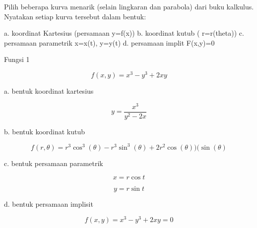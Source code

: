 \documentclass[12pt,arial,letterpaper]{book}
\begin{document}
\begin{eulercomment}
\begin{eulercomment}
\begin{eulercomment}
\begin{eulercomment}
\begin{eulercomment}
\begin{eulercomment}
\begin{eulercomment}
\begin{eulercomment}
\begin{eulercomment}
\begin{eulercomment}
\begin{eulercomment}
\begin{eulercomment}
\begin{eulercomment}
\begin{eulercomment}
\begin{eulercomment}
\begin{eulercomment}
\begin{eulercomment}
\begin{eulercomment}
\begin{eulercomment}
\begin{eulercomment}
\begin{eulercomment}
\begin{eulercomment}
\begin{eulercomment}
\end{eulercomment}
\eulersubheading{}
\begin{eulercomment}
Pilih beberapa kurva menarik (selain lingkaran dan parabola) dari buku
kalkulus. Nyatakan setiap kurva tersebut dalam bentuk:\\
\end{eulercomment}
\begin{eulerttcomment}
  a. koordinat Kartesius (persamaan y=f(x))
  b. koordinat kutub ( r=r(theta))
  c. persamaan parametrik x=x(t), y=y(t)
  d. persamaan implit F(x,y)=0
\end{eulerttcomment}
\begin{eulercomment}
Fungsi 1\\
\end{eulercomment}
\begin{eulerformula}
\[
f(x,y)=x^3-y^3+2xy
\]
\end{eulerformula}
\begin{eulercomment}
a. bentuk koordinat kartesius\\
\end{eulercomment}
\begin{eulerformula}
\[
y=\frac{x^3}{y^2-2x}
\]
\end{eulerformula}
\begin{eulercomment}
b. bentuk koordinat kutub\\
\end{eulercomment}
\begin{eulerformula}
\[
f(r,\theta)=r^3\cos^3{(\theta)}-r^3\sin^3{(\theta)}+2r^2\cos(\theta))(\sin(\theta)
\]
\end{eulerformula}
\begin{eulercomment}
c. bentuk persamaan parametrik\\
\end{eulercomment}
\begin{eulerformula}
\[
x=r\cos t
\]
\end{eulerformula}
\begin{eulerformula}
\[
y=r\sin t
\]
\end{eulerformula}
\begin{eulercomment}
d. bentuk persamaan implisit\\
\end{eulercomment}
\begin{eulerformula}
\[
f(x,y)=x^3-y^3+2xy=0
\]
\end{eulerformula}

\end{eulercomment}
\end{eulercomment}
\end{eulercomment}
\end{eulercomment}
\end{eulercomment}
\end{eulercomment}
\end{eulercomment}
\end{eulercomment}
\end{eulercomment}
\end{eulercomment}
\end{eulercomment}
\end{eulercomment}
\end{eulercomment}
\end{eulercomment}
\end{eulercomment}
\end{eulercomment}
\end{eulercomment}
\end{eulercomment}
\end{eulercomment}
\end{eulercomment}
\end{eulercomment}
\end{eulercomment}
\end{document}
